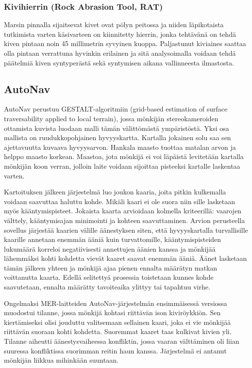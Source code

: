 \documentclass[finnish]{tktltiki2}
\theoremstyle{definition}
\theoremstyle{remark}
\begin{document}
\subsubsection{Kivihierrin (Rock Abrasion Tool, RAT)}
Marsin pinnalla sijaitsevat kivet ovat pölyn peitossa ja niiden läpikotaista tutkimista varten käsivarteen on kiinnitetty hierrin, jonka tehtävänä on tehdä kiven pintaan noin 45 millimetrin syvyinen kuoppa. Paljastunut kiviaines saattaa olla pintaan verrattuna hyvinkin erilainen ja sitä analysoimalla voidaan tehdä päätelmiä kiven syntyperästä sekä syntymisen aikana vallinneesta ilmastosta.\cite{abra}

\subsection{AutoNav}
AutoNav perustuu GESTALT-algoritmiin (grid-based estimation of surface traversability applied to local terrain), jossa mönkijän stereokameroiden ottamista kuvista luodaan malli tämän välittömästä ympäristöstä. Yksi osa mallista on ruudukkopohjainen hyvyyskartta. Kartalla jokainen solu saa sen ajettavuutta kuvaava hyvyysarvon. Hankala maasto tuottaa matalan arvon ja helppo maasto korkean. Maastoa, jota mönkijä ei voi läpäistä levitetään kartalla mönkijän koon verran, jolloin laite voidaan sijoittaa pisteeksi kartalle laskentaa varten.

Kartoituksen jälkeen järjestelmä luo joukon kaaria, joita pitkin kulkemalla voidaan saavuttaa haluttu kohde. Mikäli kaari ei ole suora niin sille lasketaan myös kääntymispisteet. Jokaista kaarta arvioidaan kolmella kriteerillä: vaarojen välttely, kääntymisajan minimointi ja kohteen saavuttaminen. Arvion perusteella sovellus järjestää kaarien välille äänestyksen siten, että hyvyyskartalla turvallisille kaarille annetaan enemmän ääniä kuin turvattomille, kääntymispisteiden lukumäärä korreloi negatiivisesti annettujen äänien kanssa ja mönkijää lähemmäksi kohti kohdetta vievät kaaret saavat enemmän ääniä. Äänet lasketaan tämän jälkeen yhteen ja mönkijä ajaa pienen ennalta määrätyn matkan voittanutta kaarta. Edellä selitettyä prosessia toistetaan kunnes kohde saavutetaan, ennalta määrätty tavoiteaika ylittyy tai tapahtuu virhe.

Ongelmaksi MER-laitteiden AutoNav-järjestelmän ensimmäisessä versiossa muodostui tilanne, jossa mönkijä kohtasi riittävän ison kiviröykkiön. Sen kiertämiseksi olisi jouduttu valitsemaan sellainen kaari, joka ei vie mönkijää riittävän suoraan kohti kohdetta. Suoremmat kaaret taas kulkivat kivien yli. Tilanne aiheutti äänestysvaiheessa konfliktin, jossa vaaran välttäminen oli liian suuressa konfliktissa suorimman reitin haun kanssa. Järjestelmä ei antanut mönkijän liikkua mihinkään suuntaan.
\end{document}
